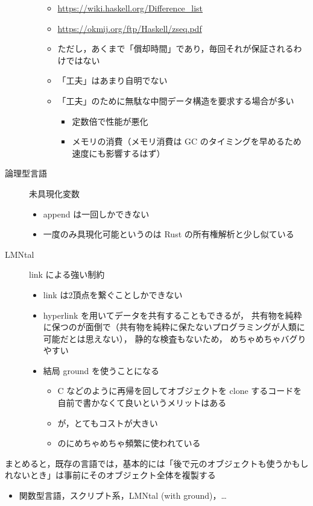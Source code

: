 \documentclass[10pt, a4j, twocolumn]{scrartcl}
\begin{document}
\begin{description}
\begin{itemize}
\begin{itemize}
\item \url{https://wiki.haskell.org/Difference\_list}
\item \url{https://okmij.org/ftp/Haskell/zseq.pdf}
\item ただし，あくまで「償却時間」であり，毎回それが保証されるわけではない
\item 「工夫」はあまり自明でない
\item 「工夫」のために無駄な中間データ構造を要求する場合が多い
\begin{itemize}
\item 定数倍で性能が悪化
\item メモリの消費（メモリ消費は GC のタイミングを早めるため速度にも影響するはず）
\end{itemize}
\end{itemize}
\end{itemize}
\item[{論理型言語}] 未具現化変数
\begin{itemize}
\item append は一回しかできない
\item 一度のみ具現化可能というのは Rust の所有権解析と少し似ている
\end{itemize}
\item[{LMNtal}] link による強い制約
\begin{itemize}
\item link は2頂点を繋ぐことしかできない
\item hyperlink を用いてデータを共有することもできるが，
共有物を純粋に保つのが面倒で（共有物を純粋に保たないプログラミングが人類に可能だとは思えない），
静的な検査もないため，
めちゃめちゃバグりやすい
\item 結局 ground を使うことになる
\begin{itemize}
\item C などのように再帰を回してオブジェクトを clone するコードを自前で書かなくて良いというメリットはある
\item が，とてもコストが大きい
\item のにめちゃめちゃ頻繁に使われている
\end{itemize}
\end{itemize}
\end{description}



まとめると，既存の言語では，基本的には「後で元のオブジェクトも使うかもしれないとき」は事前にそのオブジェクト全体を複製する
\begin{itemize}
\item 関数型言語，スクリプト系，LMNtal (with ground)，\ldots{}
\end{itemize}
\end{document}
